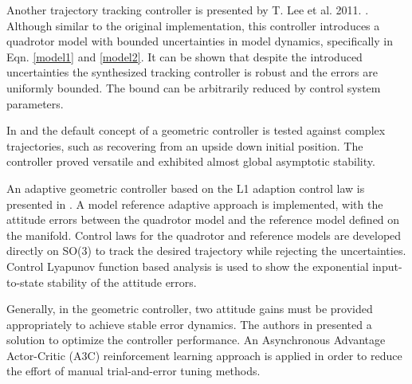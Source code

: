 Another trajectory tracking controller is presented by T. Lee et al. 2011. \cite{LeeClanak3}. Although similar to the original implementation, this controller introduces a quadrotor model with bounded uncertainties in model dynamics, specifically in Eqn. \ref{model1} and \ref{model2}. It can be shown that despite the introduced uncertainties the synthesized tracking controller is robust and the errors are uniformly bounded. The bound can be arbitrarily reduced by control system parameters. 

In \cite{LeeClanak1} and \cite{manuvresGeometric} the default concept of a geometric controller is tested against complex trajectories, such as recovering from an upside down initial position. The controller proved versatile and exhibited almost global asymptotic stability. 

An adaptive geometric controller based on the L1 adaption control law is presented in \cite{Kotaru2019GeometricLA}. A model reference adaptive approach is implemented, with the attitude errors between the quadrotor model and the reference model defined on the manifold. Control laws for the quadrotor and reference models are developed directly on SO(3) to track the desired trajectory while rejecting the uncertainties. Control Lyapunov function based analysis is used to show the exponential input-to-state stability of the attitude errors.

Generally, in the geometric controller, two attitude gains must be provided appropriately to achieve stable error dynamics. The authors in \cite{Lee2019} presented a solution to optimize the controller performance. An Asynchronous Advantage Actor-Critic (A3C) reinforcement learning approach is applied in order to reduce the effort of manual trial-and-error tuning methods. 

